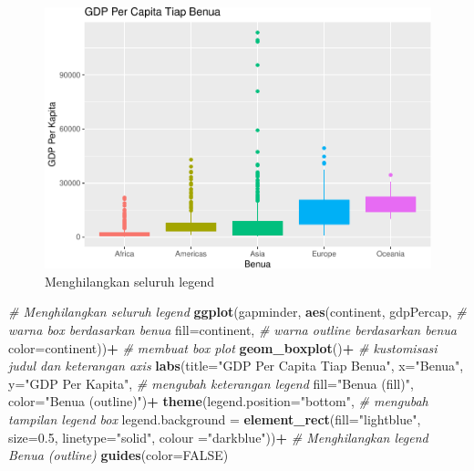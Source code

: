 \documentclass[]{book}
\newenvironment{Shaded}{\begin{snugshade}}{\end{snugshade}}
\newcommand{\KeywordTok}[1]{\textcolor[rgb]{0.13,0.29,0.53}{\textbf{#1}}}
\newcommand{\DataTypeTok}[1]{\textcolor[rgb]{0.13,0.29,0.53}{#1}}
\newcommand{\FloatTok}[1]{\textcolor[rgb]{0.00,0.00,0.81}{#1}}
\newcommand{\StringTok}[1]{\textcolor[rgb]{0.31,0.60,0.02}{#1}}
\newcommand{\CommentTok}[1]{\textcolor[rgb]{0.56,0.35,0.01}{\textit{#1}}}
\newcommand{\OtherTok}[1]{\textcolor[rgb]{0.56,0.35,0.01}{#1}}
\newcommand{\OperatorTok}[1]{\textcolor[rgb]{0.81,0.36,0.00}{\textbf{#1}}}
\newcommand{\NormalTok}[1]{#1}
\begin{document}
\begin{figure}

{\centering \includegraphics[width=0.7\linewidth]{EnvStat_files/figure-latex/gglegend4-1} 

}

\caption{Menghilangkan seluruh legend}\label{fig:gglegend4}
\end{figure}

\begin{Shaded}
\begin{Highlighting}[]
\CommentTok{# Menghilangkan seluruh legend}
\KeywordTok{ggplot}\NormalTok{(gapminder, }\KeywordTok{aes}\NormalTok{(continent, gdpPercap, }
                      \CommentTok{# warna box berdasarkan benua}
                      \DataTypeTok{fill=}\NormalTok{continent,}
                      \CommentTok{# warna outline berdasarkan benua}
                      \DataTypeTok{color=}\NormalTok{continent))}\OperatorTok{+}
\StringTok{  }\CommentTok{# membuat box plot}
\StringTok{  }\KeywordTok{geom_boxplot}\NormalTok{()}\OperatorTok{+}
\StringTok{  }\CommentTok{# kustomisasi judul dan keterangan axis}
\StringTok{  }\KeywordTok{labs}\NormalTok{(}\DataTypeTok{title=}\StringTok{"GDP Per Capita Tiap Benua"}\NormalTok{,}
       \DataTypeTok{x=}\StringTok{"Benua"}\NormalTok{, }\DataTypeTok{y=}\StringTok{"GDP Per Kapita"}\NormalTok{,}
       \CommentTok{# mengubah keterangan legend}
       \DataTypeTok{fill=}\StringTok{"Benua (fill)"}\NormalTok{,}
       \DataTypeTok{color=}\StringTok{"Benua (outline)"}\NormalTok{)}\OperatorTok{+}
\StringTok{  }\KeywordTok{theme}\NormalTok{(}\DataTypeTok{legend.position=}\StringTok{"bottom"}\NormalTok{,}
        \CommentTok{# mengubah tampilan legend box }
        \DataTypeTok{legend.background =} \KeywordTok{element_rect}\NormalTok{(}\DataTypeTok{fill=}\StringTok{"lightblue"}\NormalTok{,}
                                  \DataTypeTok{size=}\FloatTok{0.5}\NormalTok{, }\DataTypeTok{linetype=}\StringTok{"solid"}\NormalTok{, }
                                  \DataTypeTok{colour =}\StringTok{"darkblue"}\NormalTok{))}\OperatorTok{+}
\StringTok{  }\CommentTok{# Menghilangkan legend Benua (outline)}
\StringTok{  }\KeywordTok{guides}\NormalTok{(}\DataTypeTok{color=}\OtherTok{FALSE}\NormalTok{)}
\end{Highlighting}
\end{Shaded}
\end{document}
